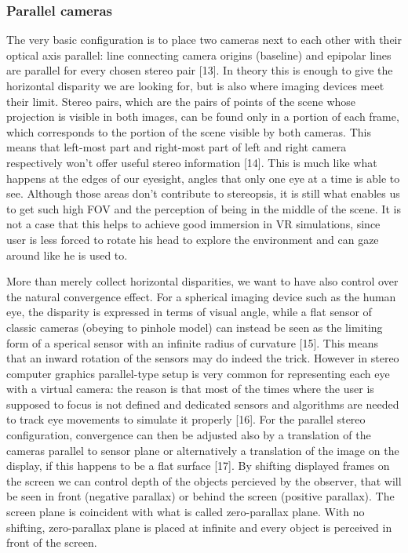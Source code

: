 \subsubsection{Parallel cameras}
The very basic configuration is to place two cameras next to each other with their optical axis parallel: line connecting camera origins (baseline) and epipolar lines are parallel for every chosen stereo pair [13]. In theory this is enough to give the horizontal disparity we are looking for, but is also where imaging devices meet their limit. Stereo pairs, which are the pairs of points of the scene whose projection is visible in both images, can be found only in a portion of each frame, which corresponds to the portion of the scene visible by both cameras. This means that left-most part and right-most part of left and right camera respectively won't offer useful stereo information [14]. This is much like what happens at the edges of our eyesight, angles that only one eye at a time is able to see. Although those areas don't contribute to stereopsis, it is still what enables us to get such high FOV and the perception of being in the middle of the scene. It is not a case that this helps to achieve good immersion in VR simulations, since user is less forced to rotate his head to explore the environment and can gaze around like he is used to.

More than merely collect horizontal disparities, we want to have also control over the natural convergence effect. For a spherical imaging device such as the human eye, the disparity is expressed in terms of visual angle, while a flat sensor of classic cameras (obeying to pinhole model) can instead be seen as the limiting form of a sperical sensor with an infinite radius of curvature [15]. This means that an inward rotation of the sensors may do indeed the trick. However in stereo computer graphics parallel-type setup is very common for representing each eye with a virtual camera: the reason is that most of the times where the user is supposed to focus is not defined and dedicated sensors and algorithms are needed to track eye movements to simulate it properly [16]. For the parallel stereo configuration, convergence can then be adjusted also by a translation of the cameras parallel to sensor plane or alternatively a translation of the image on the display, if this happens to be a flat surface [17]. By shifting displayed frames on the screen we can control depth of the objects percieved by the observer, that will be seen in front (negative parallax) or behind the screen (positive parallax). The screen plane is coincident with what is called zero-parallax plane. With no shifting, zero-parallax plane is placed at infinite and every object is perceived in front of the screen.


